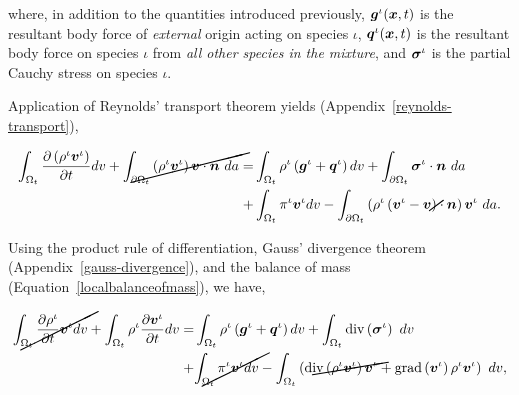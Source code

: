 where, in addition to the quantities introduced previously,
$\mbox{\boldmath$ g$}^{\iota}(\mbox{\boldmath$ x$},t)$ is the resultant body force of {\em external} origin
acting on species $\iota$, $\mbox{\boldmath$ q$}^{\iota}(\mbox{\boldmath$ x$},t)$ is the resultant body
force on species $\iota$ from {\em all other species in the mixture},
and $\mbox{\boldmath$\sigma$}^{\iota}$ is the partial Cauchy stress on species $\iota$.

Application of Reynolds' transport theorem yields
(Appendix~\ref{reynolds-transport}), 

\begin{equation*}
\begin{split}
\int_{\Omega_{t}} \frac{\partial \left(\rho^{\iota}\bv^{\iota}\right)}{\partial t} dv
+\cancel{\int_{\partial \Omega_{t}} \left(\rho^{\iota}\bv^{\iota}\right) \bv \cdot \bn\ da} =
& \int_{\Omega_{t}} \rho^{\iota} \left(\bg^{\iota}+\bq^{\iota}\right) dv 
+ \int_{\partial \Omega_{t}} \Bsigma^{\iota}\cdot\bn\ da\\
+ & \int_{\Omega_{t}} \pi^{\iota}\bv^{\iota} dv
- \int_{\partial \Omega_{t}} \left(\rho^{\iota} \left(\bv^{\iota} -
\cancel{\bv}\right) \cdot \bn \right) \bv^{\iota}\ da.
\end{split}
\end{equation*}

Using the product rule of differentiation, Gauss' divergence
theorem (Appendix~\ref{gauss-divergence}), and the balance of mass
(Equation~\ref{localbalanceofmass}), we have,



\begin{equation*}
\begin{split}
\cancel{\int_{\Omega_{t}} \frac{\partial \rho^{\iota}} {\partial t}
\bv^{\iota} dv} + \int_{\Omega_{t}} \rho^{\iota} \frac{\partial
  \bv^{\iota}} {\partial t} dv = 
& \int_{\Omega_{t}} \rho^{\iota} \left(\bg^{\iota}+\bq^{\iota}\right) dv 
+ \int_{\Omega_{t}} \mathrm{div}\left(\Bsigma^{\iota}\right)\ dv\\
+ & \cancel{\int_{\Omega_{t}} \pi^{\iota}\bv^{\iota} dv}
- \int_{\Omega_{t}}\left(\cancel{\mathrm{div}
\left(\rho^{\iota}\bv^{\iota}\right) \bv^{\iota}} +
\mathrm{grad}\left(\bv^{\iota}\right) \rho^{\iota}\bv^{\iota}\right)\ dv, 
\end{split}
\end{equation*}

